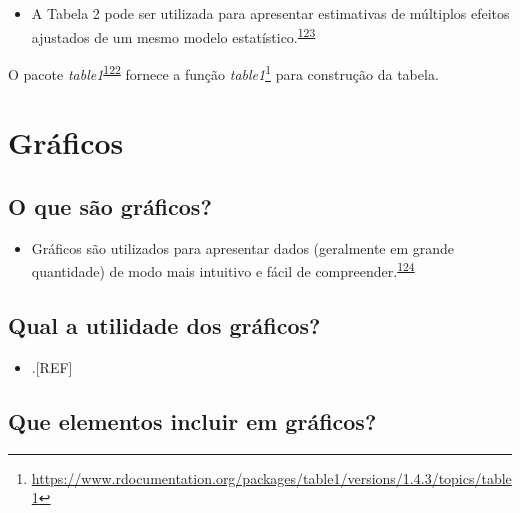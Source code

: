 \documentclass[
]{book}
\providecommand{\tightlist}{%
  \setlength{\itemsep}{0pt}\setlength{\parskip}{0pt}}
\renewcommand{\href}[2]{#2\footnote{\url{#1}}}
\newenvironment{infobox}[1]
  {
  \begin{itemize}
  \renewcommand{\labelitemi}{
    \raisebox{-.7\height}[0pt][0pt]{
      {\setkeys{Gin}{width=3em,keepaspectratio}
        \texttt{[image: \#1]}}
    }
  }
  \setlength{\fboxsep}{1em}
  \begin{blackbox}
  \item
  }
  {
  \end{blackbox}
  \end{itemize}
  }
\begin{document}
\begin{itemize}
\tightlist
\item
  A Tabela 2 pode ser utilizada para apresentar estimativas de múltiplos efeitos ajustados de um mesmo modelo estatístico.\textsuperscript{\protect\hyperlink{ref-Westreich2013}{123}}
\end{itemize}

\begin{infobox}{images/Rlogo}
O pacote \emph{table1}\textsuperscript{\protect\hyperlink{ref-table1}{122}} fornece a função \href{https://www.rdocumentation.org/packages/table1/versions/1.4.3/topics/table1}{\emph{table1}} para construção da tabela.

\end{infobox}

\hypertarget{graficos}{%
\section{Gráficos}\label{graficos}}

\hypertarget{o-que-suxe3o-gruxe1ficos}{%
\subsection{O que são gráficos?}\label{o-que-suxe3o-gruxe1ficos}}

\begin{itemize}
\tightlist
\item
  Gráficos são utilizados para apresentar dados (geralmente em grande quantidade) de modo mais intuitivo e fácil de compreender.\textsuperscript{\protect\hyperlink{ref-Park2022}{124}}
\end{itemize}

\hypertarget{qual-a-utilidade-dos-gruxe1ficos}{%
\subsection{Qual a utilidade dos gráficos?}\label{qual-a-utilidade-dos-gruxe1ficos}}

\begin{itemize}
\tightlist
\item
  .{[}REF{]}
\end{itemize}

\hypertarget{que-elementos-incluir-em-gruxe1ficos}{%
\subsection{Que elementos incluir em gráficos?}\label{que-elementos-incluir-em-gruxe1ficos}}
\end{document}
